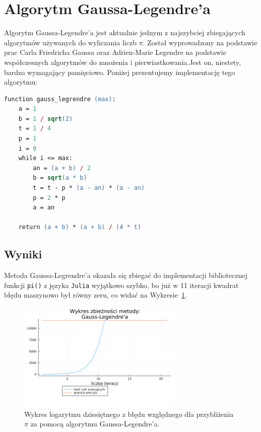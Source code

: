 \section{Algorytm Gaussa-Legendre'a}

Algorytm Gaussa-Legendre'a jest aktualnie jednym z najszybciej zbiegających algorytmów używanych do wyliczania liczb $\pi$. Został wyprowadzony na podstawie prac Carla Friedricha Gaussa oraz Adrien-Marie Legendre na podstawie współczesnych algorytmów do mnożenia i pierwiastkowania.Jest on, niestety, bardzo wymagający pamięciowo. Poniżej prezentujemy implementację tego algorytmu\cite{gausse2}:

\newpage

\begin{lstlisting}[language=ps]
function gauss_legrendre (max):
    a = 1
    b = 1 / sqrt(2)
    t = 1 / 4
    p = 1
    i = 0
    while i <= max:
        an = (a + b) / 2
        b = sqrt(a * b)
        t = t - p * (a - an) * (a - an)
        p = 2 * p
        a = an
    
    return (a + b) * (a + b) / (4 * t)
\end{lstlisting}

\subsection{Wyniki}

Metoda Gaussa-Legrendre'a okazała się zbiegać do implementacji bibliotecznej funkcji \verb+pi()+ z języka \verb+Julia+ wyjątkowo szybko, bo już w 11 iteracji kwadrat błędu maszynowo był równy zeru, co widać na Wykresie~\ref{gauss-error}.

\begin{figure}[!h]
    \centering
    \renewcommand{\figurename}{Wykres}
    \includegraphics[width=0.7\textwidth]{../prog/gauss_legendre_log_error.png}
    \caption{Wykres logarytmu dziesiętnego z błędu względnego dla przybliżenia $\pi$ za pomocą algorytmu Gaussa-Legendre'a.}
    \label{gauss-error}
\end{figure}

